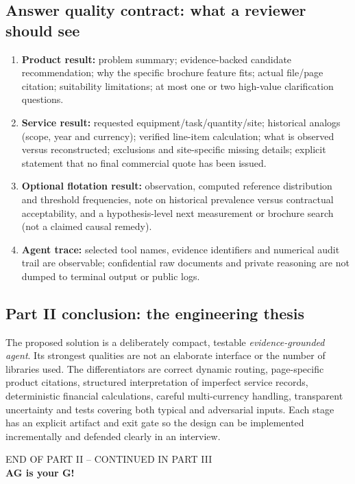\documentclass[11pt,a4paper]{article}
\begin{document}
\subsection{Answer quality contract: what a reviewer should see}
\begin{enumerate}
\item \textbf{Product result:} problem summary; evidence-backed candidate recommendation; why the specific brochure feature fits; actual file/page citation; suitability limitations; at most one or two high-value clarification questions.
\item \textbf{Service result:} requested equipment/task/quantity/site; historical analogs (scope, year and currency); verified line-item calculation; what is observed versus reconstructed; exclusions and site-specific missing details; explicit statement that no final commercial quote has been issued.
\item \textbf{Optional flotation result:} observation, computed reference distribution and threshold frequencies, note on historical prevalence versus contractual acceptability, and a hypothesis-level next measurement or brochure search (not a claimed causal remedy).
\item \textbf{Agent trace:} selected tool names, evidence identifiers and numerical audit trail are observable; confidential raw documents and private reasoning are not dumped to terminal output or public logs.
\end{enumerate}

\subsection{Part II conclusion: the engineering thesis}
The proposed solution is a deliberately compact, testable \emph{evidence-grounded agent}. Its strongest qualities are not an elaborate interface or the number of libraries used. The differentiators are correct dynamic routing, page-specific product citations, structured interpretation of imperfect service records, deterministic financial calculations, careful multi-currency handling, transparent uncertainty and tests covering both typical and adversarial inputs. Each stage has an explicit artifact and exit gate so the design can be implemented incrementally and defended clearly in an interview.

\vspace{5mm}
\begin{center}
{\sffamily\color{Gray}\footnotesize END OF PART II -- CONTINUED IN PART III}\\[2mm]
{\sffamily\bfseries\color{Navy}AG is your G!}
\end{center}
\end{document}
